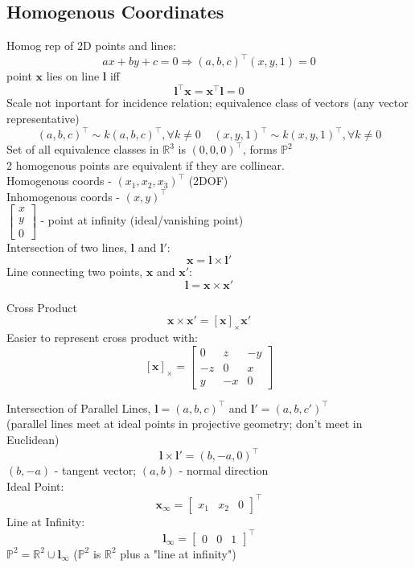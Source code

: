 \documentclass{article}
\begin{document}
\subsection{Homogenous Coordinates}
Homog rep of 2D points and lines:
\[
    ax+by+c = 0 \Rightarrow (a,b,c)^\top (x,y,1) = 0
\]
\noindent
point $\mathbf x$ lies on line $\mathbf l$ iff
\[
    \mathbf l^\top \mathbf x = \mathbf x^\top \mathbf l = 0
\]
Scale not inportant for incidence relation; equivalence class of vectors (any vector representative)
\[
    (a,b,c)^\top \sim k(a,b,c)^\top , \forall k \ne 0 \ \ \ \ \
    (x,y,1)^\top \sim k(x,y,1)^\top, \forall k \ne 0
\]
Set of all equivalence classes in $\mathbb R^3$ is $(0,0,0)^\top$, forms $\mathbb P^2$
\\
2 homogenous points are equivalent if they are collinear.\\
Homogenous coords - $(x_1, x_2, x_3)^\top$ (2DOF)\\
Inhomogenous coords - $(x,y)^\top$ \\[5pt]
$
\begin{bmatrix}
    x \\ y\\ 0
\end{bmatrix}
$ - point at infinity (ideal/vanishing point)
\\[10pt]
Intersection of two lines, $\mathbf l$ and $\mathbf l'$:
\[
    \mathbf x = \mathbf l \times \mathbf l'
\]
Line connecting two points, $\mathbf x$ and $\mathbf x'$:
\[
    \mathbf l = \mathbf x \times \mathbf x'
\]
\begin{expln}
{Cross Product}{}
\[
    \mathbf x \times \mathbf x' = {[\mathbf x]}_\times \mathbf x'
\]
Easier to represent cross product with:
\[
    \mathbf{[x]}_\times =\begin{bmatrix}
        0 & z & -y \\ 
        -z & 0 & x \\
        y & -x & 0
    \end{bmatrix}
\]
\end{expln}
\noindent
Intersection of Parallel Lines, $\mathbf l = (a,b,c)^\top$ and $\mathbf l' = (a,b,c')^\top$
\\
(parallel lines meet at ideal points in projective geometry; don't meet in Euclidean)
\[
    \mathbf l \times \mathbf l' = (b, -a, 0)^\top
\]
$(b,-a)$ - tangent vector; $(a,b)$ - normal direction
\\[5pt]
Ideal Point: \[
    \mathbf x_\infty = \begin{bmatrix}
        x_1 & x_2 & 0
    \end{bmatrix}^\top
    \]
Line at Infinity:
\[
    \mathbf l_\infty = \begin{bmatrix}
        0 & 0 & 1
    \end{bmatrix}^\top
\]
$\mathbb P^2 = \mathbb R^2 \cup \mathbf l_\infty$ 
($\mathbb P^2$ is $\mathbb R^2$ plus a "line at infinity")
\end{document}
